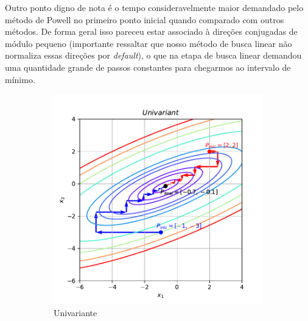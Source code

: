 \documentclass[10pt, a4paper]{article}
\begin{document}
Outro ponto digno de nota é o tempo consideravelmente maior demandado pelo método de Powell no primeiro ponto inicial quando comparado com outros métodos. De forma geral isso
pareceu estar associado à direções conjugadas de módulo pequeno (importante ressaltar que nosso método de busca linear não normaliza essas direções por \textit{default}),
o que na etapa de busca linear demandou uma quantidade grande de passos constantes para chegarmos ao intervalo de mínimo.

\begin{figure}[htpb]
  \centering
  \begin{subfigure}[b]{0.32\textwidth}
      \centering
      \includegraphics[width=\textwidth]{images/q1a_Univariant.pdf}
      \caption{Univariante}
      \label{fig:q1a_univariant}
  \end{subfigure}
  \hfill
  \begin{subfigure}[b]{0.32\textwidth}
    \centering

\end{subfigure}
\end{figure}
\end{document}
